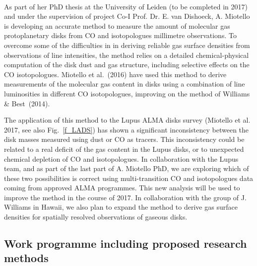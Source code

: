 \documentclass[10pt,fleqn,twoside]{article}
\begin{document}
\vspace{1em}{\Tcol\bf Disk gas masses from ALMA observations}\\
As part of her PhD thesis at the University of Leiden (to be completed in 2017) and under the supervision of project Co-I Prof. Dr. E. van Dishoeck, A. Miotello is developing an accurate method to measure the amount of molecular gas protoplanetary disks from CO and isotopologues millimetre observations. To overcome some of the difficulties in in deriving reliable gas surface densities from observations of line intensities, the method relies on a detailed chemical-physical computation of the disk dust and gas structure, including selective effects on the CO isotopologues. Miotello et al.~(2016) have used this method to derive measurements of the molecular gas content in disks using a combination of line luminosities in different CO isotopologues, improving on the method of Williams \& Best~(2014).

The application of this method to the Lupus ALMA disks survey (Miotello et al. 2017, see also Fig.~\ref{f_LADS}) has shown a significant inconsistency between the disk masses measured using dust or CO as tracers. This inconsistency could be related to a real deficit of the gas content in the Lupus disks, or to unexpected chemical depletion of CO and isotopologues. In collaboration with the Lupus team, and as part of the last part of A. Miotello PhD, we are exploring which of these two possibilities is correct using multi-transition CO and isotopologues data coming from approved ALMA programmes. This new analysis will be used to improve the method in the course of 2017. In collaboration with the group of J. Williams in Hawaii, we also plan to expand the method to derive gas surface densities for spatially resolved observations of gaseous disks.

\subsection{Work programme including proposed research methods}
\label{s_work}


\end{document}
